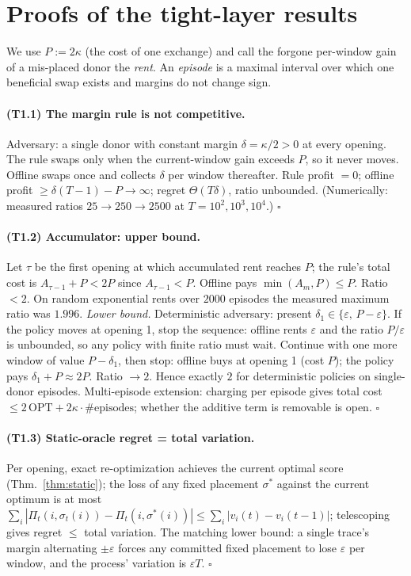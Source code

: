 \documentclass[10pt,twocolumn]{article}
\theoremstyle{definition}
\begin{document}
\section{Proofs of the tight-layer results}\label{app:tight}

We use $P:=2\kappa$ (the cost of one exchange) and call the forgone per-window gain of a
mis-placed donor the \emph{rent}. An \emph{episode} is a maximal interval over which one
beneficial swap exists and margins do not change sign.

\paragraph{(T1.1) The margin rule is not competitive.}
Adversary: a single donor with constant margin $\delta=\kappa/2>0$ at every opening. The
rule swaps only when the current-window gain exceeds $P$, so it never moves. Offline swaps
once and collects $\delta$ per window thereafter. Rule profit $=0$; offline profit
$\ge \delta(T-1)-P\to\infty$; regret $\Theta(T\delta)$, ratio unbounded. (Numerically:
measured ratios $25\to250\to2500$ at $T=10^2,10^3,10^4$.) \hfill$\square$

\paragraph{(T1.2) Accumulator: upper bound.}
Let $\tau$ be the first opening at which accumulated rent reaches $P$; the rule's total cost
is $A_{\tau-1}+P<2P$ since $A_{\tau-1}<P$. Offline pays $\min(A_m,P)\le P$. Ratio $<2$. On
random exponential rents over $2000$ episodes the measured maximum ratio was $1.996$.
\emph{Lower bound.} Deterministic adversary: present $\delta_1\in\{\varepsilon,\,P-\varepsilon\}$.
If the policy moves at opening 1, stop the sequence: offline rents $\varepsilon$ and the
ratio $P/\varepsilon$ is unbounded, so any policy with finite ratio must wait. Continue
with one more window of value $P-\delta_1$, then stop: offline buys at opening 1 (cost $P$);
the policy pays $\delta_1+P\approx2P$. Ratio $\to2$. Hence exactly $2$ for deterministic
policies on single-donor episodes. Multi-episode extension: charging per episode gives
total cost $\le 2\,\mathrm{OPT}+2\kappa\cdot\#\text{episodes}$; whether the additive term is
removable is open. \hfill$\square$

\paragraph{(T1.3) Static-oracle regret = total variation.}
Per opening, exact re-optimization achieves the current optimal score
(Thm.~\ref{thm:static}); the loss of any fixed placement $\sigma^\ast$ against the current
optimum is at most $\sum_i|\Pi_t(i,\sigma_t(i))-\Pi_t(i,\sigma^\ast(i))|
\le\sum_i|v_i(t)-v_i(t-1)|$; telescoping gives regret $\le$ total variation. The matching
lower bound: a single trace's margin alternating $\pm\varepsilon$ forces any committed fixed
placement to lose $\varepsilon$ per window, and the process' variation is $\varepsilon T$.
\hfill$\square$
\end{document}
